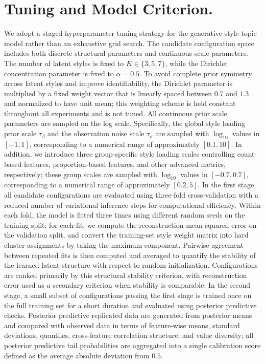 \documentclass[12pt]{article}
\begin{document}
\section{Tuning and Model Criterion.}
We adopt a staged hyperparameter tuning strategy for the generative style-topic model rather than an exhaustive grid search. 
The candidate configuration space includes both discrete structural parameters and continuous scale parameters. 
The number of latent styles is fixed to $K \in \{3,5,7\}$, while the Dirichlet concentration parameter is fixed to $\alpha = 0.5$. 
To avoid complete prior symmetry across latent styles and improve identifiability, the Dirichlet parameter is multiplied by a fixed weight vector that is linearly spaced between $0.7$ and $1.3$ and normalized to have unit mean; this weighting scheme is held constant throughout all experiments and is not tuned. 
All continuous prior scale parameters are sampled on the log scale. 
Specifically, the global style loading prior scale $\tau_\beta$ and the observation noise scale $\tau_\sigma$ are sampled with $\log_{10}$ values in $[-1,1]$, corresponding to a numerical range of approximately $[0.1,10]$. 
In addition, we introduce three group-specific style loading scales controlling count-based features, proportion-based features, and other advanced metrics, respectively; these group scales are sampled with $\log_{10}$ values in $[-0.7,0.7]$, corresponding to a numerical range of approximately $[0.2,5]$. 
In the first stage, all candidate configurations are evaluated using three-fold cross-validation with a reduced number of variational inference steps for computational efficiency. 
Within each fold, the model is fitted three times using different random seeds on the training split; for each fit, we compute the reconstruction mean squared error on the validation split, and convert the training-set style weight matrix into hard cluster assignments by taking the maximum component. 
Pairwise agreement between repeated fits is then computed and averaged to quantify the stability of the learned latent structure with respect to random initialization. 
Configurations are ranked primarily by this structural stability criterion, with reconstruction error used as a secondary criterion when stability is comparable. 
In the second stage, a small subset of configurations passing the first stage is trained once on the full training set for a short duration and evaluated using posterior predictive checks. 
Posterior predictive replicated data are generated from posterior means and compared with observed data in terms of feature-wise means, standard deviations, quantiles, cross-feature correlation structure, and value diversity; all posterior predictive tail probabilities are aggregated into a single calibration score defined as the average absolute deviation from $0.5$. 
\end{document}
